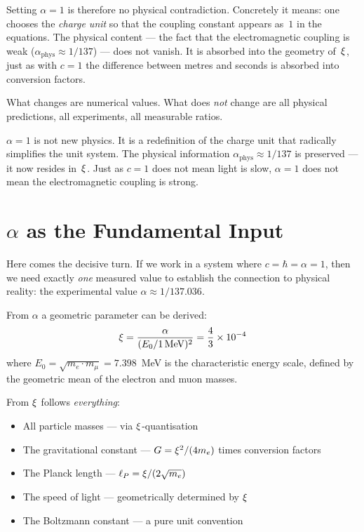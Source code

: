 Setting $\alpha = 1$ is therefore no physical contradiction. Concretely it means: one chooses the \emph{charge unit} so that the coupling constant appears as~$1$ in the equations. The physical content --- the fact that the electromagnetic coupling is weak ($\alpha_{\text{phys}} \approx 1/137$) --- does not vanish. It is absorbed into the geometry of~$\xi$, just as with $c = 1$ the difference between metres and seconds is absorbed into conversion factors.

What changes are numerical values. What does \emph{not} change are all physical predictions, all experiments, all measurable ratios.

\begin{kerngedanke}
$\alpha = 1$ is not new physics. It is a redefinition of the charge unit that radically simplifies the unit system. The physical information $\alpha_{\text{phys}} \approx 1/137$ is preserved --- it now resides in~$\xi$. Just as $c = 1$ does not mean light is slow, $\alpha = 1$ does not mean the electromagnetic coupling is strong.
\end{kerngedanke}

\section{$\alpha$ as the Fundamental Input}

Here comes the decisive turn. If we work in a system where $c = \hbar = \alpha = 1$, then we need exactly \emph{one} measured value to establish the connection to physical reality: the experimental value $\alpha \approx 1/137.036$.

From $\alpha$ a geometric parameter can be derived:
\begin{equation}
\xi = \frac{\alpha}{(E_0/1\,\text{MeV})^2} = \frac{4}{3} \times 10^{-4}
\end{equation}
where $E_0 = \sqrt{m_e \cdot m_\mu} = 7.398$~MeV is the characteristic energy scale, defined by the geometric mean of the electron and muon masses.

From $\xi$ follows \emph{everything}:
\begin{itemize}
\item All particle masses --- via $\xi$-quantisation
\item The gravitational constant --- $G = \xi^2/(4m_e)$ times conversion factors
\item The Planck length --- $\ell_P = \xi/(2\sqrt{m_e})$
\item The speed of light --- geometrically determined by $\xi$
\item The Boltzmann constant --- a pure unit convention
\end{itemize}


